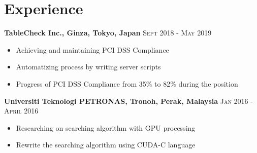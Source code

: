 \documentclass[English]{cv-style}
\begin{document}
\section{Experience}
\vspace{-0.3cm}
\textbf{TableCheck Inc., Ginza, Tokyo, Japan} 
    \quad \quad \quad \quad \quad \quad \quad \quad \quad 
    \quad \quad \quad \quad \quad \quad \quad \quad
\textsc{Sept 2018 - May 2019} \\
 \vspace{-0.15cm}
    \begin{itemize}[noitemsep]
        \item Achieving and maintaining PCI DSS Compliance
        \item Automatizing process by writing server scripts
        \item Progress of PCI DSS Compliance from 35\% to 82\% during the position
    \end{itemize}
\textbf{Universiti Teknologi PETRONAS, Tronoh, Perak, Malaysia} 
    \quad \quad \quad \quad \quad \quad \quad \quad \quad 
\textsc{Jan 2016 - April 2016} \\
 \vspace{-0.15cm}
    \begin{itemize}[noitemsep]
        \item Researching on searching algorithm with GPU processing
        \item Rewrite the searching algorithm using CUDA-C language
    \end{itemize}
\end{document}
